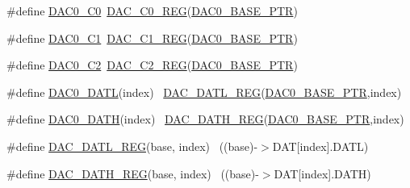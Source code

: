 \begin{DoxyCompactItemize}
\item 
\#define \hyperlink{group___d_a_c___register___accessor___macros_ga00e22b8e72b6f59cbb7c46c47c71930c}{D\+A\+C0\+\_\+\+C0}~\hyperlink{group___d_a_c___register___accessor___macros_ga2ad6906035a9d1a45b0493f8010b630b}{D\+A\+C\+\_\+\+C0\+\_\+\+R\+EG}(\hyperlink{group___d_a_c___peripheral_gabe3b30df06ec04e5c899efd6e49f1800}{D\+A\+C0\+\_\+\+B\+A\+S\+E\+\_\+\+P\+TR})
\item 
\#define \hyperlink{group___d_a_c___register___accessor___macros_ga54148f65bd470a8414d0de17427b3c50}{D\+A\+C0\+\_\+\+C1}~\hyperlink{group___d_a_c___register___accessor___macros_ga4f28424aead9b953486830b6f3c4b3e6}{D\+A\+C\+\_\+\+C1\+\_\+\+R\+EG}(\hyperlink{group___d_a_c___peripheral_gabe3b30df06ec04e5c899efd6e49f1800}{D\+A\+C0\+\_\+\+B\+A\+S\+E\+\_\+\+P\+TR})
\item 
\#define \hyperlink{group___d_a_c___register___accessor___macros_ga1f3d911fd37856fcdd26fe596f884c09}{D\+A\+C0\+\_\+\+C2}~\hyperlink{group___d_a_c___register___accessor___macros_ga5627f7a03cdcede26b3f5a60bc7a3871}{D\+A\+C\+\_\+\+C2\+\_\+\+R\+EG}(\hyperlink{group___d_a_c___peripheral_gabe3b30df06ec04e5c899efd6e49f1800}{D\+A\+C0\+\_\+\+B\+A\+S\+E\+\_\+\+P\+TR})
\item 
\#define \hyperlink{group___d_a_c___register___accessor___macros_gad1e226ca5378cccb3032a3e65ee3aabd}{D\+A\+C0\+\_\+\+D\+A\+TL}(index)                                              ~\hyperlink{group___d_a_c___register___accessor___macros_gabf321758d2caebaf297aed5907b1bb5d}{D\+A\+C\+\_\+\+D\+A\+T\+L\+\_\+\+R\+EG}(\hyperlink{group___d_a_c___peripheral_gabe3b30df06ec04e5c899efd6e49f1800}{D\+A\+C0\+\_\+\+B\+A\+S\+E\+\_\+\+P\+TR},index)
\item 
\#define \hyperlink{group___d_a_c___register___accessor___macros_gab4d4a155e15a18015eddcab55644a588}{D\+A\+C0\+\_\+\+D\+A\+TH}(index)                                              ~\hyperlink{group___d_a_c___register___accessor___macros_ga2993d3474a391b72469826f58317edc9}{D\+A\+C\+\_\+\+D\+A\+T\+H\+\_\+\+R\+EG}(\hyperlink{group___d_a_c___peripheral_gabe3b30df06ec04e5c899efd6e49f1800}{D\+A\+C0\+\_\+\+B\+A\+S\+E\+\_\+\+P\+TR},index)
\item 
\#define \hyperlink{group___d_a_c___register___accessor___macros_gabf321758d2caebaf297aed5907b1bb5d}{D\+A\+C\+\_\+\+D\+A\+T\+L\+\_\+\+R\+EG}(base,  index)                              ~((base)-\/$>$D\+AT\mbox{[}index\mbox{]}.D\+A\+TL)
\item 
\#define \hyperlink{group___d_a_c___register___accessor___macros_ga2993d3474a391b72469826f58317edc9}{D\+A\+C\+\_\+\+D\+A\+T\+H\+\_\+\+R\+EG}(base,  index)                              ~((base)-\/$>$D\+AT\mbox{[}index\mbox{]}.D\+A\+TH)

\end{DoxyCompactItemize}
